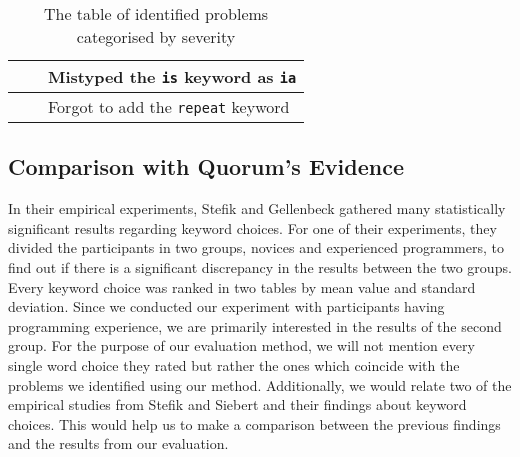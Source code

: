 \documentclass[10pt]{sigplanconf}
\begin{document}
\begin{table*}[]
\begin{minipage}[c]{\textwidth}
\begin{center}
\begin{tabular}{| p{5cm} | p{5cm} | p{5cm} |}
                                                           &                                                                    & Mistyped the \lstinline!is! keyword as \lstinline!ia!					                                   \\ \hline
                                                           &                                                                    & Forgot to add the \lstinline!repeat! keyword		                                                       \\ \hline
\end{tabular}
\end{center}
\caption{The table of identified problems categorised by severity}
\label{QuorumProblemResult}
\end{minipage}
\end{table*}

\subsection{Comparison with Quorum's Evidence}
In their empirical experiments, Stefik and Gellenbeck \cite{EmpStudiesonStimuli} gathered many statistically significant results regarding keyword choices. 
For one of their  experiments, they divided the participants in two groups, novices and experienced programmers, to find out if there is a significant discrepancy in the results between the two groups. Every keyword choice was ranked in two tables by mean value and standard deviation. Since we conducted our experiment with participants having programming experience, we are primarily interested in the results of the second group. For the purpose of our evaluation method, we will not mention every single word choice they rated but rather the ones which coincide with the problems we identified using our method.
Additionally, we would relate two of the empirical studies from Stefik and Siebert \cite{Empiricalinvestigation} and their findings about keyword choices. This would help us to make a comparison between the previous findings and the results from our evaluation.
\end{document}
